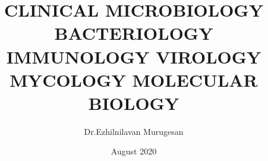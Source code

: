 
\title{CLINICAL MICROBIOLOGY BACTERIOLOGY IMMUNOLOGY VIROLOGY MYCOLOGY MOLECULAR BIOLOGY}

\author{Dr.Ezhilnilavan Murugesan}

\date{August 2020}


\maketitle
